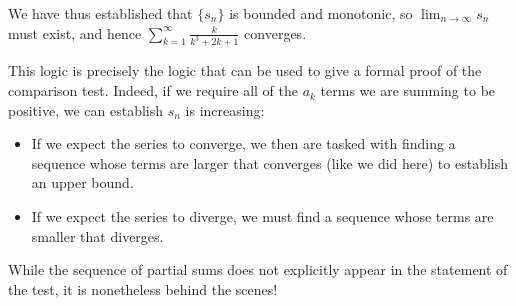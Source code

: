 \documentclass{ximera}
\begin{document}
\begin{exercise}
\begin{exercise}
We have thus established that $\{s_n\}$ is bounded and monotonic, so $\lim_{n \to \infty} s_n$ must exist, and hence  $\sum_{k=1}^{\infty} \frac{k}{k^3+2k+1}$ converges.

\begin{exercise}
This logic is precisely the logic that can be used to give a formal proof of the comparison test.  Indeed, if we require all of the $a_k$ terms we are summing to be positive, we can establish $s_n$ is increasing:

\begin{itemize}
\item  If we expect the series to converge, we then are tasked with finding a sequence whose terms are larger that converges (like we did here) to establish an upper bound.  
\item If we expect the series to diverge, we must find a sequence whose terms are smaller that diverges.
\end{itemize}

While the sequence of partial sums does not explicitly appear in the statement of the test, it is nonetheless behind the scenes!  
\end{exercise}
\end{exercise}
\end{exercise}
\end{document}
